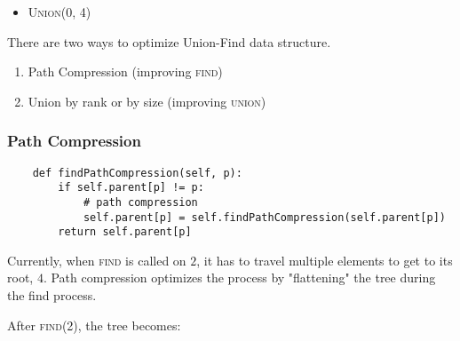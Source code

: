 \begin{itemize}
\begin{center}
    \end{center}
  \item \textsc{Union(0, 4)}
    \begin{center}
    \end{center}
\end{itemize}

There are two ways to optimize Union-Find data structure.

\begin{enumerate}
  \item Path Compression (improving \textsc{find})
  \item Union by rank or by size (improving \textsc{union})
\end{enumerate}

\subsubsection{Path Compression}

\begin{verbatim}
    def findPathCompression(self, p):
        if self.parent[p] != p:
            # path compression
            self.parent[p] = self.findPathCompression(self.parent[p])
        return self.parent[p]
\end{verbatim}

\noindent Currently, when \textsc{find} is called on $2$, it has to travel multiple elements to get to its root, $4$.
Path compression optimizes the process by "flattening" the tree during the find process.

\noindent After \textsc{find(2)}, the tree becomes:

\begin{center}
\end{center}

